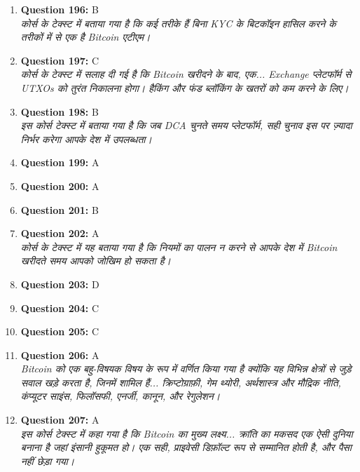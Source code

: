 \documentclass[12pt,a4paper]{article}
\begin{document}
\begin{enumerate}
\item \textbf{Question 196:} B
\\ \textit{कोर्स के टेक्स्ट में बताया गया है कि कई तरीके हैं बिना KYC के बिटकॉइन हासिल करने के तरीकों में से एक है Bitcoin एटीएम।}

\item \textbf{Question 197:} C
\\ \textit{कोर्स के टेक्स्ट में सलाह दी गई है कि Bitcoin खरीदने के बाद, एक... Exchange प्लेटफॉर्म से UTXOs को तुरंत निकालना होगा। हैकिंग और फंड ब्लॉकिंग के खतरों को कम करने के लिए।}

\item \textbf{Question 198:} B
\\ \textit{इस कोर्स टेक्स्ट में बताया गया है कि जब DCA चुनते समय प्लेटफॉर्म, सही चुनाव इस पर ज़्यादा निर्भर करेगा आपके देश में उपलब्धता।}

\item \textbf{Question 199:} A

\item \textbf{Question 200:} A

\item \textbf{Question 201:} B

\item \textbf{Question 202:} A
\\ \textit{कोर्स के टेक्स्ट में यह बताया गया है कि नियमों का पालन न करने से आपके देश में Bitcoin खरीदते समय आपको जोखिम हो सकता है।}

\item \textbf{Question 203:} D

\item \textbf{Question 204:} C

\item \textbf{Question 205:} C

\item \textbf{Question 206:} A
\\ \textit{Bitcoin को एक बहु-विषयक विषय के रूप में वर्णित किया गया है क्योंकि यह विभिन्न क्षेत्रों से जुड़े सवाल खड़े करता है, जिनमें शामिल हैं... क्रिप्टोग्राफ़ी, गेम थ्योरी, अर्थशास्त्र और मौद्रिक नीति, कंप्यूटर साइंस, फिलॉसफी, एनर्जी, कानून, और रेगुलेशन।}

\item \textbf{Question 207:} A
\\ \textit{इस कोर्स टेक्स्ट में कहा गया है कि Bitcoin का मुख्य लक्ष्य... क्रांति का मकसद एक ऐसी दुनिया बनाना है जहां इंसानी हुकूमत हो। एक सही, प्राइवेसी डिफ़ॉल्ट रूप से सम्मानित होती है, और पैसा नहीं छेड़ा गया।}


\end{enumerate}
\end{document}
